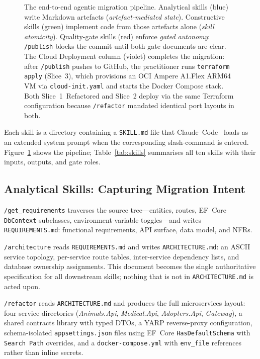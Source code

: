 \documentclass[10pt,journal,compsoc]{IEEEtran}
\begin{document}
\begin{figure}[!t]
  \centering
  
  \caption{The end-to-end agentic migration pipeline.
    Analytical skills (blue) write Markdown artefacts
    (\emph{artefact-mediated state}).
    Constructive skills (green) implement code from those artefacts
    alone (\emph{skill atomicity}).
    Quality-gate skills (red) enforce \emph{gated autonomy}:
    \texttt{/publish} blocks the commit until both gate documents
    are clear.
    The Cloud Deployment column (violet) completes the migration:
    after \texttt{/publish} pushes to GitHub, the practitioner runs
    \texttt{terraform apply} (Slice~3), which provisions an OCI
    Ampere A1.Flex ARM64 VM via \texttt{cloud-init.yaml} and starts
    the Docker Compose stack.  Both Slice~1~Refactored and Slice~2
    deploy via the same Terraform configuration because
    \texttt{/refactor} mandated identical port layouts in both.}
  \label{fig:pipeline}
\end{figure}

Each skill is a directory containing a \texttt{SKILL.md} file that
Claude~Code~\cite{anthropic2024claude} loads as an extended system
prompt when the corresponding slash-command is entered.
Figure~\ref{fig:pipeline} shows the pipeline; Table~\ref{tab:skills}
summarises all ten skills with their inputs, outputs, and gate roles.

\subsection{Analytical Skills: Capturing Migration Intent}
\texttt{/get\_requirements} traverses the source tree—entities,
routes, EF~Core \texttt{DbContext} subclasses, environment-variable
toggles—and writes \texttt{REQUIREMENTS.md}: functional requirements,
API surface, data model, and NFRs.

\texttt{/architecture} reads \texttt{REQUIREMENTS.md} and writes
\texttt{ARCHITECTURE.md}: an ASCII service topology, per-service route
tables, inter-service dependency lists, and database ownership
assignments.  This document becomes the single authoritative
specification for all downstream skills; nothing that is not in
\texttt{ARCHITECTURE.md} is acted upon.

\texttt{/refactor} reads \texttt{ARCHITECTURE.md} and produces the
full microservices layout: four service directories
(\textit{Animals.Api}, \textit{Medical.Api}, \textit{Adopters.Api},
\textit{Gateway}), a shared contracts library with typed DTOs, a YARP
reverse-proxy configuration, schema-isolated
\texttt{appsettings.json} files using EF~Core
\texttt{HasDefaultSchema} with \texttt{Search~Path} overrides, and a
\texttt{docker-compose.yml} with \texttt{env\_file} references
rather than inline secrets.
\end{document}
